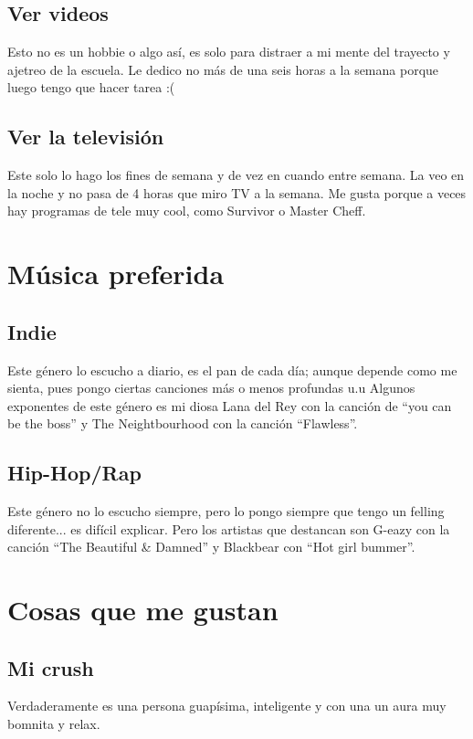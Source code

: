\documentclass[letterpaper, 12pt]{article}
\begin{document}
    \subsection{\large{Ver videos }}
        \normalsize{Esto no es un hobbie o algo así, es solo para distraer a mi mente del trayecto y ajetreo de la escuela. Le dedico no más de una seis horas a la semana porque luego tengo que hacer tarea :(}
    \subsection{\large{Ver la televisión}}
        \normalsize{Este solo lo hago los fines de semana y de vez en cuando entre semana. La veo en la noche y no pasa de 4 horas que miro TV a la semana. Me gusta porque a veces hay programas de tele muy cool, como Survivor o Master Cheff.}


\section{\Large{Música preferida}}
    \subsection{\large{Indie}}
        \normalsize{Este género lo escucho a diario, es el pan de cada día; aunque depende como me sienta, pues pongo ciertas canciones más o menos profundas u.u  Algunos exponentes de este género es mi diosa Lana del Rey con la canción de ``you can be the boss'' y The Neightbourhood con la canción ``Flawless''.} 
    \subsection{\large{Hip-Hop/Rap}}
        \normalsize{Este género no lo escucho siempre, pero lo pongo siempre que tengo un felling diferente... es difícil explicar. Pero los artistas que destancan son G-eazy con la canción ``The Beautiful \& Damned'' y Blackbear con ``Hot girl bummer''.}
    
    
\section{\Large{Cosas que me gustan}}
    \subsection{\large{Mi crush}}
        \normalsize{Verdaderamente es una persona guapísima, inteligente y con una un aura muy bomnita y relax.}
\end{document}
